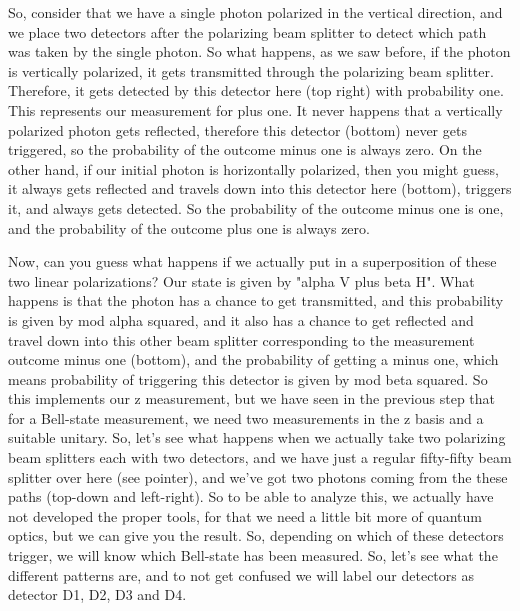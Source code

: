 So, consider that we have a single photon polarized in the vertical direction, and we place two detectors after the polarizing beam splitter to detect which path was taken by the single photon. So what happens, as we saw before, if the photon is vertically polarized, it gets transmitted through the polarizing beam splitter. Therefore, it gets detected by this detector here (top right) with probability one. This represents our measurement for plus one. It never happens that a vertically polarized photon gets reflected, therefore this detector (bottom) never gets triggered, so the probability of the outcome minus one is always zero. On the other hand, if our initial photon is horizontally polarized, then you might guess, it always gets reflected and travels down into this detector here (bottom), triggers it, and always gets detected. So the probability of the outcome minus one is one, and the probability of the outcome plus one is always zero.

Now, can you guess what happens if we actually put in a superposition of these two linear polarizations? Our state is given by "alpha V plus beta H". What happens is that the photon has a chance to get transmitted, and this probability is given by mod alpha squared, and it also has a chance to get reflected and travel down into this other beam splitter corresponding to the measurement outcome minus one (bottom), and the probability of getting a minus one, which means probability of triggering this detector is given by mod beta squared. So this implements our z measurement, but we have seen in the previous step that for a Bell-state measurement, we need two measurements in the z basis and a suitable unitary. So, let's see what happens when we actually take two polarizing beam splitters each with two detectors, and we have just a regular fifty-fifty beam splitter over here (see pointer), and we've got two photons coming from the these paths (top-down and left-right). So to be able to analyze this, we actually have not developed the proper tools, for that we need a little bit more of quantum optics, but we can give you the result. So, depending on which of these detectors trigger, we will know which Bell-state has been measured. So, let's see what the different patterns are, and to not get confused we will label our detectors as detector D1, D2, D3 and D4.

